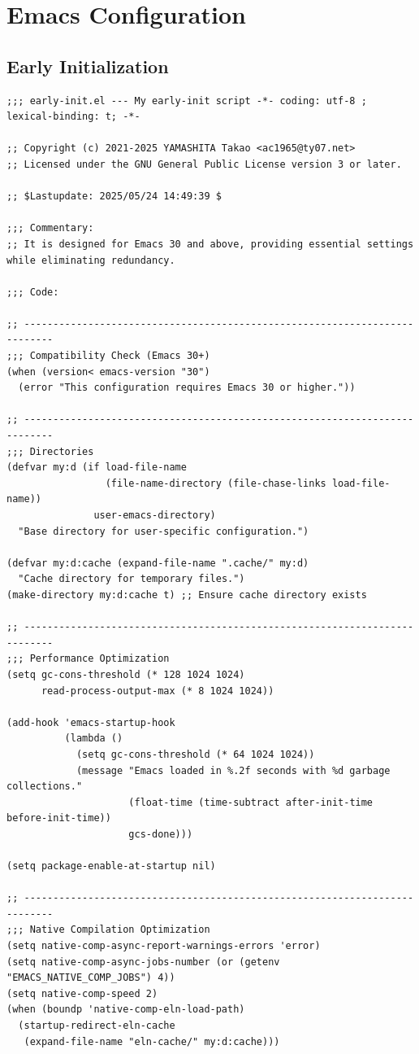 \documentclass[11pt]{article}
\begin{document}
\section{Emacs Configuration}
\label{sec:org28f0f61}
\subsection{Early Initialization}
\label{sec:orgc35d508}

\begin{verbatim}
;;; early-init.el --- My early-init script -*- coding: utf-8 ; lexical-binding: t; -*-

;; Copyright (c) 2021-2025 YAMASHITA Takao <ac1965@ty07.net>
;; Licensed under the GNU General Public License version 3 or later.

;; $Lastupdate: 2025/05/24 14:49:39 $

;;; Commentary:
;; It is designed for Emacs 30 and above, providing essential settings while eliminating redundancy.

;;; Code:

;; ---------------------------------------------------------------------------
;;; Compatibility Check (Emacs 30+)
(when (version< emacs-version "30")
  (error "This configuration requires Emacs 30 or higher."))

;; ---------------------------------------------------------------------------
;;; Directories
(defvar my:d (if load-file-name
                 (file-name-directory (file-chase-links load-file-name))
               user-emacs-directory)
  "Base directory for user-specific configuration.")

(defvar my:d:cache (expand-file-name ".cache/" my:d)
  "Cache directory for temporary files.")
(make-directory my:d:cache t) ;; Ensure cache directory exists

;; ---------------------------------------------------------------------------
;;; Performance Optimization
(setq gc-cons-threshold (* 128 1024 1024)
      read-process-output-max (* 8 1024 1024))

(add-hook 'emacs-startup-hook
          (lambda ()
            (setq gc-cons-threshold (* 64 1024 1024))
            (message "Emacs loaded in %.2f seconds with %d garbage collections."
                     (float-time (time-subtract after-init-time before-init-time))
                     gcs-done)))

(setq package-enable-at-startup nil)

;; ---------------------------------------------------------------------------
;;; Native Compilation Optimization
(setq native-comp-async-report-warnings-errors 'error)
(setq native-comp-async-jobs-number (or (getenv "EMACS_NATIVE_COMP_JOBS") 4))
(setq native-comp-speed 2)
(when (boundp 'native-comp-eln-load-path)
  (startup-redirect-eln-cache
   (expand-file-name "eln-cache/" my:d:cache)))


\end{verbatim}
\end{document}
